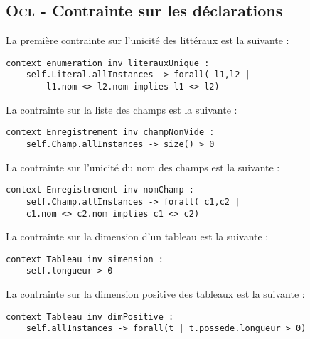 
\subsection{\textsc{Ocl} - Contrainte sur les déclarations}
\label{sec:question15}

La première contrainte sur l'unicité des littéraux est la suivante :

\begin{lstlisting}[caption=unicité des litéraux,captionpos=b,label={lst:lit_unique},language=OCL]
context enumeration inv literauxUnique :
	self.Literal.allInstances -> forall( l1,l2 | 
		l1.nom <> l2.nom implies l1 <> l2)
\end{lstlisting}

La contrainte sur la liste des champs est la suivante :

\begin{lstlisting}[caption=champ non vide,captionpos=b,label={lst:champ},language=OCL]
context Enregistrement inv champNonVide :
	self.Champ.allInstances -> size() > 0
\end{lstlisting}

La contrainte sur l'unicité du nom des champs est la suivante :

\begin{lstlisting}[caption=Nom unique des champs,captionpos=b,label={lst:champ_unique},language=OCL]
context Enregistrement inv nomChamp :
	self.Champ.allInstances -> forall( c1,c2 | 
	c1.nom <> c2.nom implies c1 <> c2)
\end{lstlisting}

La contrainte sur la dimension d'un tableau est la suivante :

\begin{lstlisting}[caption=dimension d'un tableau,captionpos=b,label={lst:dim_tableau},language=OCL]
context Tableau inv simension :
	self.longueur > 0
\end{lstlisting}

La contrainte sur la dimension positive des tableaux est la suivante :

\begin{lstlisting}[caption=Dimension positive,captionpos=b,label={lst:dim_positive},language=OCL]
context Tableau inv dimPositive :
	self.allInstances -> forall(t | t.possede.longueur > 0)
\end{lstlisting}